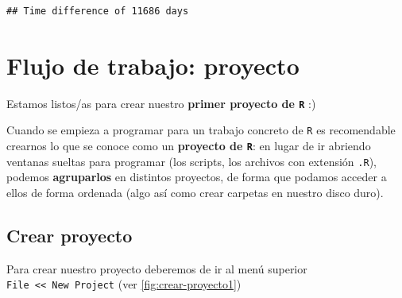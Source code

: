\documentclass[11pt,]{book}
\newenvironment{Shaded}{\begin{snugshade}}{\end{snugshade}}
\newcommand{\CommentTok}[1]{\textcolor[rgb]{0.37,0.37,0.37}{\textit{#1}}}
\newcommand{\KeywordTok}[1]{\textcolor[rgb]{0.27,0.27,0.27}{\textbf{#1}}}
\newcommand{\NormalTok}[1]{#1}
\newcommand{\OperatorTok}[1]{\textcolor[rgb]{0.43,0.43,0.43}{\textbf{#1}}}
\newcommand{\StringTok}[1]{\textcolor[rgb]{0.5,0.5,0.5}{#1}}
\begin{document}
\begin{Shaded}
\end{Shaded}

\begin{verbatim}
## Time difference of 11686 days
\end{verbatim}

\hypertarget{flujo-de-trabajo-proyecto}{%
\chapter{Flujo de trabajo: proyecto}\label{flujo-de-trabajo-proyecto}}

Estamos listos/as para crear nuestro \textbf{primer proyecto de \texttt{R}} :)

Cuando se empieza a programar para un trabajo concreto de \texttt{R} es recomendable crearnos lo que se conoce como un \textbf{proyecto de \texttt{R}}: en lugar de ir abriendo ventanas sueltas para programar (los scripts, los archivos con extensión \texttt{.R}), podemos \textbf{agruparlos} en distintos proyectos, de forma que podamos acceder a ellos de forma ordenada (algo así como crear carpetas en nuestro disco duro).

\hypertarget{crear-proyecto}{%
\section{Crear proyecto}\label{crear-proyecto}}

Para crear nuestro proyecto deberemos de ir al menú superior \texttt{File\ \textless{}\textless{}\ New\ Project} (ver \ref{fig:crear-proyecto1})
\end{document}
